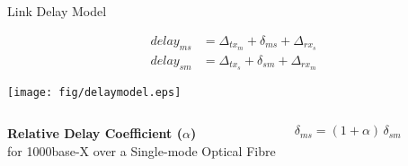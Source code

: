 \documentclass[compress,red]{beamer}
\begin{document}
\subsection{}
\begin{frame}{Link Delay Model}

  \begin{align}
    \nonumber delay_{ms} &= \Delta_{tx_m} + \delta_{ms} + \Delta_{rx_s} \\
    \nonumber delay_{sm} &= \Delta_{tx_s} + \delta_{sm} + \Delta_{rx_m}
  \end{align}

   \vspace{0.2cm}

  \begin{center}
  \texttt{[image: fig/delaymodel.eps]}
  \end{center}

\begin{columns}[c]
  \column{2.8in}

    \begin{center}
      \textbf{Relative Delay Coefficient ($\alpha$)} \\
      for 1000base-X over a Single-mode Optical Fibre
    \end{center}

  \column{1.5in}
    \begin{center}
      \begin{equation}
      \nonumber \delta_{ms} = (1 + \alpha) \, \delta_{sm}
      \end{equation}
    \end{center}
    \vspace{0.5cm}
\end{columns}
  

\end{frame}
\end{document}
